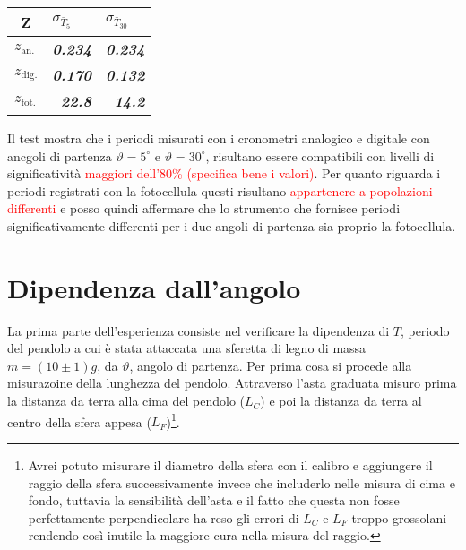 \documentclass{article}
\begin{document}
\begin{table}[H]
	\centering
	\begin{tabular}{@{}lrr@{}}
		\toprule
		\multicolumn{1}{c}{Z} & \multicolumn{1}{l}{$\sigma_{\bar{T}_5}$} & \multicolumn{1}{l}{$\sigma_{\bar{T}_{30}}$} \\ \midrule
		$z_{\text{an.}}$      & \textit{\textbf{0.234}}                  & \textit{\textbf{0.234}}                   \\
		$z_{\text{dig.}}$     & \textit{\textbf{0.170}}                  & \textit{\textbf{0.132}}                   \\
		$z_{\text{fot.}}$     & \textit{\textbf{22.8}}                   & \textit{\textbf{14.2}}                    \\ \bottomrule
	\end{tabular}
\end{table}

Il test mostra che i periodi misurati con i cronometri analogico e digitale con ancgoli di partenza $\vartheta = 5^\circ$ e $\vartheta = 30^\circ$, risultano essere compatibili con livelli di significatività \textcolor{red}{maggiori dell'80\% (specifica bene i valori)}. Per quanto riguarda i periodi registrati con la fotocellula questi risultano \textcolor{red}{appartenere a popolazioni differenti} e posso quindi affermare che lo strumento che fornisce periodi significativamente differenti per i due angoli di partenza sia proprio la fotocellula.









\newpage
\section{Dipendenza dall’angolo}
La prima parte dell'esperienza consiste nel verificare la dipendenza di $T$, periodo del pendolo a cui è stata attaccata una sferetta di legno di massa $m = (10 \pm 1)g$, da $\vartheta$, angolo di partenza.  Per prima cosa si procede alla misurazoine della lunghezza del pendolo. Attraverso l'asta graduata misuro prima la distanza da terra alla cima del pendolo ($L_C$) e poi la distanza da terra al centro della sfera appesa ($L_F$)\footnote{Avrei potuto misurare il diametro della sfera con il calibro e aggiungere il raggio della sfera successivamente invece che includerlo nelle misura di cima e fondo, tuttavia la sensibilità dell'asta e il fatto che questa non fosse perfettamente perpendicolare ha reso gli errori di $L_C$ e $L_F$ troppo grossolani rendendo così inutile la maggiore cura nella misura del raggio.}. 
\end{document}
